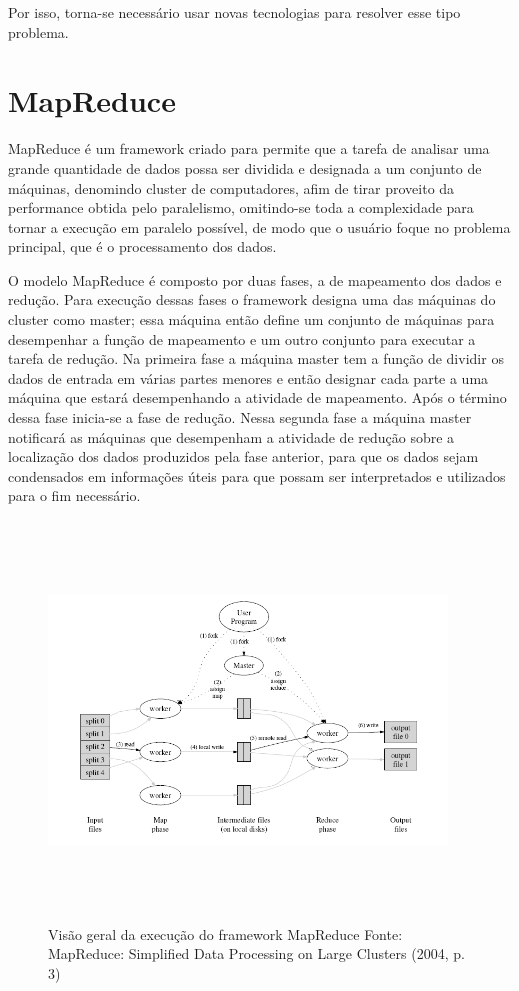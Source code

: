 \documentclass[a4paper,12pt]{article}
\begin{document}
Por isso, torna-se necessário usar novas tecnologias para resolver esse tipo
problema.


\section{\textbf{MapReduce}}

MapReduce é um framework criado para permite que a tarefa de analisar uma grande
quantidade de dados possa ser dividida e designada a um conjunto de máquinas,
denomindo cluster de computadores, afim de tirar proveito da performance obtida
pelo paralelismo, omitindo-se toda a complexidade para tornar a execução em
paralelo possível, de modo que o usuário foque no problema principal, que é o
processamento dos dados.

O modelo MapReduce é composto por duas fases, a de mapeamento dos dados e
redução. Para execução dessas fases o framework designa uma das
máquinas do cluster como master; essa máquina então define um conjunto de
máquinas para desempenhar a função de mapeamento e um outro conjunto para
executar a tarefa de redução. Na primeira fase a máquina master tem a função de
dividir os dados de entrada em várias partes menores e então designar cada parte
a uma máquina que estará desempenhando a atividade de mapeamento. Após o término
dessa fase inicia-se a fase de redução. Nessa segunda fase a máquina master
notificará as máquinas que desempenham a atividade de redução sobre a
localização dos dados produzidos pela fase anterior, para que os dados sejam
condensados em informações úteis para que possam ser interpretados e utilizados
para o fim necessário.

\begin{figure}[ht]
  \centering
  \includegraphics[width=400px,height=400px]{img/mapreduce.png}
  \caption{Visão geral da execução do framework MapReduce\newline
  Fonte: MapReduce: Simplified Data Processing on Large Clusters (2004, p. 3)}
\end{figure}
\end{document}
